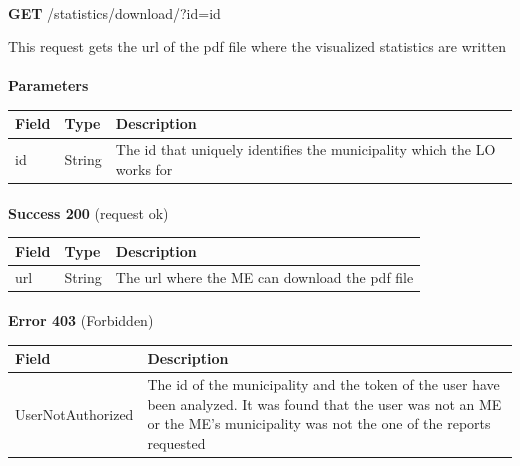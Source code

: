 						\paragraph{}
						\textbf{GET} /statistics/download/?id={id}
						
						This request gets the url of the pdf file where the visualized statistics are written
						\paragraph{}
							\textbf{Parameters}
							\begin{table}[!h]
								\begin{tabular}{L{0.2\textwidth}L{0.2\textwidth}L{0.4\textwidth}}
									\toprule
									Field & Type & Description \\
									\midrule
								 	id & String & The id that uniquely identifies the municipality which the LO works for \\
								 	\bottomrule
								\end{tabular}
							\end{table}
						\paragraph{}
							\textbf{Success 200} (request ok)
							\begin{table}[!h]
								\begin{tabular}{L{0.25\textwidth}L{0.1\textwidth}L{0.45\textwidth}}
									\toprule
									Field & Type & Description \\
									\midrule
									url & String & The url where the ME can download the pdf file \\
								 	\bottomrule
								\end{tabular}
							\end{table}
						\paragraph{}
							\textbf{Error 403} (Forbidden)
							\begin{table}[!h]
								\begin{tabular}{L{0.4\textwidth}L{0.4\textwidth}}
									\toprule
									Field & Description \\
									\midrule
								  	UserNotAuthorized & The id of the municipality and the token of the user have been analyzed. It was found that the user was not an ME or the ME's  municipality was not the one of the reports requested \\
								 	\bottomrule
								\end{tabular}
							\end{table}
